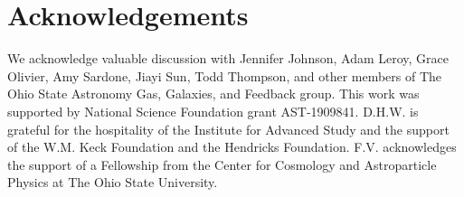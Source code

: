 \documentclass[ms.tex]{subfiles}
\begin{document}
 

\section{Acknowledgements} 
\label{sec:acknowledgements} 

We acknowledge valuable discussion with Jennifer Johnson, Adam Leroy, Grace 
Olivier, Amy Sardone, Jiayi Sun, Todd Thompson, and other members of The Ohio 
State Astronomy Gas, Galaxies, and Feedback group. 
This work was supported by National Science Foundation grant AST-1909841. 
D.H.W. is grateful for the hospitality of the Institute for Advanced Study and 
the support of the W.M. Keck Foundation and the Hendricks Foundation. 
F.V. acknowledges the support of a Fellowship from the Center for Cosmology and 
Astroparticle Physics at The Ohio State University. 
\end{document}
